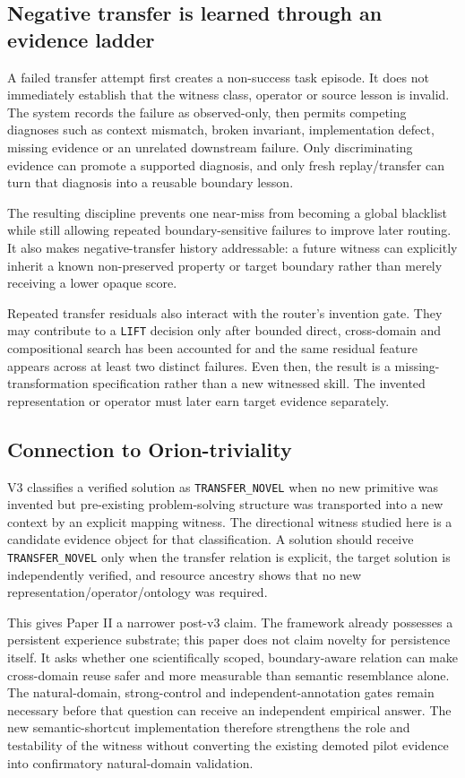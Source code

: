 \subsection{Negative transfer is learned through an evidence ladder}
A failed transfer attempt first creates a non-success task episode. It does not immediately establish that the witness class, operator or source lesson is invalid. The system records the failure as observed-only, then permits competing diagnoses such as context mismatch, broken invariant, implementation defect, missing evidence or an unrelated downstream failure. Only discriminating evidence can promote a supported diagnosis, and only fresh replay/transfer can turn that diagnosis into a reusable boundary lesson.

The resulting discipline prevents one near-miss from becoming a global blacklist while still allowing repeated boundary-sensitive failures to improve later routing. It also makes negative-transfer history addressable: a future witness can explicitly inherit a known non-preserved property or target boundary rather than merely receiving a lower opaque score.

Repeated transfer residuals also interact with the router's invention gate. They may contribute to a \texttt{LIFT} decision only after bounded direct, cross-domain and compositional search has been accounted for and the same residual feature appears across at least two distinct failures. Even then, the result is a missing-transformation specification rather than a new witnessed skill. The invented representation or operator must later earn target evidence separately.

\subsection{Connection to Orion-triviality}
V3 classifies a verified solution as \texttt{TRANSFER\_NOVEL} when no new primitive was invented but pre-existing problem-solving structure was transported into a new context by an explicit mapping witness. The directional witness studied here is a candidate evidence object for that classification. A solution should receive \texttt{TRANSFER\_NOVEL} only when the transfer relation is explicit, the target solution is independently verified, and resource ancestry shows that no new representation/operator/ontology was required.

This gives Paper II a narrower post-v3 claim. The framework already possesses a persistent experience substrate; this paper does not claim novelty for persistence itself. It asks whether one scientifically scoped, boundary-aware relation can make cross-domain reuse safer and more measurable than semantic resemblance alone. The natural-domain, strong-control and independent-annotation gates remain necessary before that question can receive an independent empirical answer. The new semantic-shortcut implementation therefore strengthens the role and testability of the witness without converting the existing demoted pilot evidence into confirmatory natural-domain validation.
